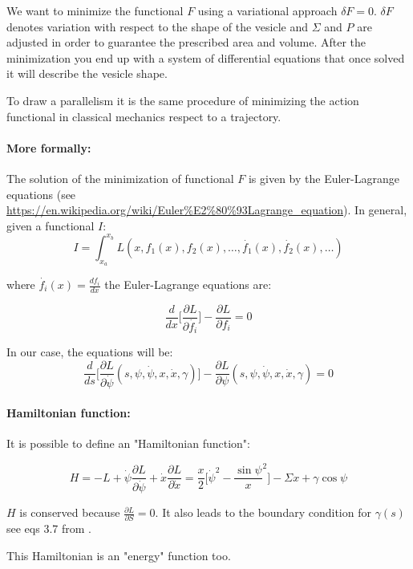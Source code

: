 \documentclass[12pt]{article}
\begin{document}
We want to minimize the functional $F$ using a variational approach $\delta F=0$. $\delta F$ denotes variation with respect to the shape of the vesicle and $\Sigma$ and $P$ are adjusted in order to guarantee the prescribed area and volume. After the minimization you end up with a system of differential equations that once solved it will describe the vesicle shape.

To draw a parallelism it is the same procedure of minimizing the action functional in classical mechanics respect to a trajectory.



\paragraph*{More formally:} 


The solution of the minimization of functional $F$ is given by the Euler-Lagrange equations (see \url{https://en.wikipedia.org/wiki/Euler%E2%80%93Lagrange_equation}). In general, given a functional $I$:
$$I=\int_{x_a}^{x_b}L(x,f_1(x),f_2(x),\dots,\dot{f_1}(x),\dot{f_2}(x),\dots)$$

where $\dot{f_i}(x)=\frac{df_i}{dx}$ the Euler-Lagrange equations are:

$$
\frac{d}{dx}\bigg[ \frac{\partial L}{\partial \dot{f_i}} \bigg] - \frac{\partial L}{\partial f_i} = 0
$$


In our case, the equations will be:
$$
\frac{d}{ds}\bigg[ \frac{\partial L}{\partial \dot{\psi}}(s,\psi,\dot{\psi},x,\dot{x},\gamma) \bigg] - \frac{\partial L}{\partial \psi}(s,\psi,\dot{\psi},x,\dot{x},\gamma) = 0
$$

\paragraph*{Hamiltonian function:}
It is possible to define an "Hamiltonian function":

\begin{equation*}
    H = -L + \dot{\psi} \frac{\partial L}{\partial \dot{\psi}} + \dot{x} \frac{\partial L}{\partial \dot{x}}
    = \frac{x}{2} \bigg[  \dot{\psi}^2 - \frac{\sin \psi}{x}^2 \bigg] - \Sigma x + \gamma \cos \psi
\end{equation*}

$H$ is conserved because $\frac{\partial L}{\partial S} = 0$. It also leads to the boundary condition for $\gamma(s)$ see eqs 3.7 from \cite{seifertShapeTransformationsVesicles1991}.

This Hamiltonian is an "energy" function too.
\end{document}
